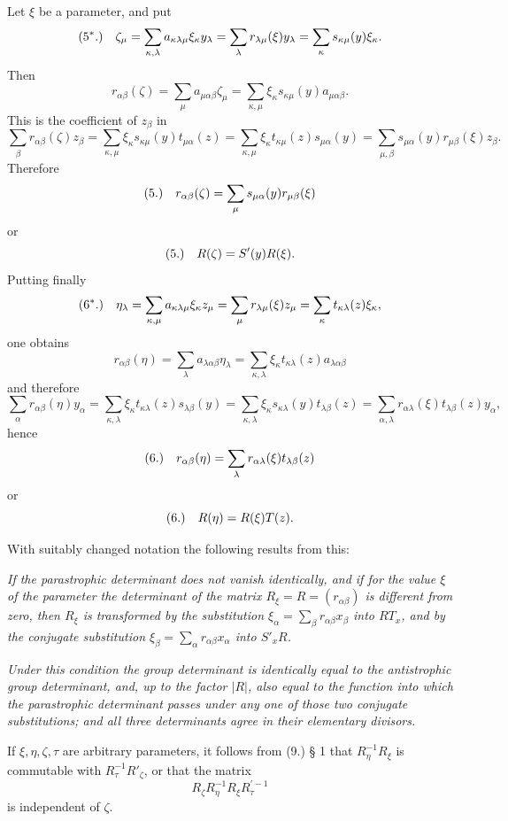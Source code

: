 \documentclass[11pt]{article}
\newcommand{\fnum}[1]{\textup{(\ensuremath{#1}.)}\quad}
\begin{document}
Let $\xi$ be a parameter, and put
\[
\fnum{5^*} \zeta_\mu=\sum_{\kappa,\lambda}a_{\kappa\lambda\mu}\xi_\kappa y_\lambda
=\sum_\lambda r_{\lambda\mu}(\xi)y_\lambda
=\sum_\kappa s_{\kappa\mu}(y)\xi_\kappa.
\]
Then
\[
 r_{\alpha\beta}(\zeta)=\sum_\mu a_{\mu\alpha\beta}\zeta_\mu
 =\sum_{\kappa,\mu}\xi_\kappa s_{\kappa\mu}(y)a_{\mu\alpha\beta}.
\]
This is the coefficient of $z_\beta$ in
\[
 \sum_\beta r_{\alpha\beta}(\zeta)z_\beta
 =\sum_{\kappa,\mu}\xi_\kappa s_{\kappa\mu}(y)t_{\mu\alpha}(z)
 =\sum_{\kappa,\mu}\xi_\kappa t_{\kappa\mu}(z)s_{\mu\alpha}(y)
 =\sum_{\mu,\beta}s_{\mu\alpha}(y)r_{\mu\beta}(\xi)z_\beta .
\]
Therefore
\[
\fnum{5} r_{\alpha\beta}(\zeta)=\sum_\mu s_{\mu\alpha}(y)r_{\mu\beta}(\xi)
\]
or
\[
\fnum{5} R(\zeta)=S'(y)R(\xi).
\]
Putting finally
\[
\fnum{6^*} \eta_\lambda=\sum_{\kappa,\mu}a_{\kappa\lambda\mu}\xi_\kappa z_\mu
=\sum_\mu r_{\lambda\mu}(\xi)z_\mu
=\sum_\kappa t_{\kappa\lambda}(z)\xi_\kappa,
\]
one obtains
\[
 r_{\alpha\beta}(\eta)=\sum_\lambda a_{\lambda\alpha\beta}\eta_\lambda
 =\sum_{\kappa,\lambda}\xi_\kappa t_{\kappa\lambda}(z)a_{\lambda\alpha\beta}
\]
and therefore
\[
 \sum_\alpha r_{\alpha\beta}(\eta)y_\alpha
 =\sum_{\kappa,\lambda}\xi_\kappa t_{\kappa\lambda}(z)s_{\lambda\beta}(y)
 =\sum_{\kappa,\lambda}\xi_\kappa s_{\kappa\lambda}(y)t_{\lambda\beta}(z)
 =\sum_{\alpha,\lambda}r_{\alpha\lambda}(\xi)t_{\lambda\beta}(z)y_\alpha,
\]
hence
\[
\fnum{6} r_{\alpha\beta}(\eta)=\sum_\lambda r_{\alpha\lambda}(\xi)t_{\lambda\beta}(z)
\]
or
\[
\fnum{6} R(\eta)=R(\xi)T(z).
\]

With suitably changed notation the following results from this:

\emph{If the parastrophic determinant does not vanish identically, and if for the value $\xi$ of the parameter the determinant of the matrix $R_\xi=R=(r_{\alpha\beta})$ is different from zero, then $R_\xi$ is transformed by the substitution $\xi_\alpha=\sum_\beta r_{\alpha\beta}x_\beta$ into $RT_x$, and by the conjugate substitution $\xi_\beta=\sum_\alpha r_{\alpha\beta}x_\alpha$ into $S'_xR$.}

\emph{Under this condition the group determinant is identically equal to the antistrophic group determinant, and, up to the factor $|R|$, also equal to the function into which the parastrophic determinant passes under any one of those two conjugate substitutions; and all three determinants agree in their elementary divisors.}

If $\xi,\eta,\zeta,\tau$ are arbitrary parameters, it follows from (9.) § 1 that $R_\eta^{-1}R_\xi$ is commutable with $R_\tau^{-1}R'_\zeta$, or that the matrix
\[
 R_\zeta R_\eta^{-1}R_\xi R_\tau^{\prime -1}
\]
is independent of $\zeta$.
\end{document}
